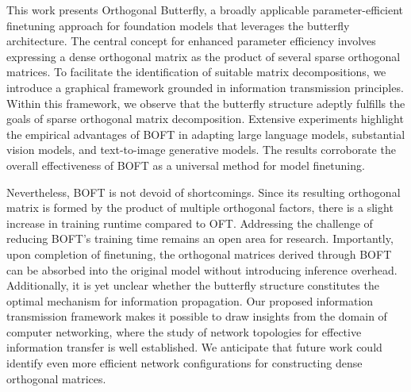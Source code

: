 This work presents Orthogonal Butterfly, a broadly applicable parameter-efficient finetuning approach for foundation models that leverages the butterfly architecture. The central concept for enhanced parameter efficiency involves expressing a dense orthogonal matrix as the product of several sparse orthogonal matrices. To facilitate the identification of suitable matrix decompositions, we introduce a graphical framework grounded in information transmission principles. Within this framework, we observe that the butterfly structure adeptly fulfills the goals of sparse orthogonal matrix decomposition. Extensive experiments highlight the empirical advantages of BOFT in adapting large language models, substantial vision models, and text-to-image generative models. The results corroborate the overall effectiveness of BOFT as a universal method for model finetuning.

Nevertheless, BOFT is not devoid of shortcomings. Since its resulting orthogonal matrix is formed by the product of multiple orthogonal factors, there is a slight increase in training runtime compared to OFT. Addressing the challenge of reducing BOFT’s training time remains an open area for research. Importantly, upon completion of finetuning, the orthogonal matrices derived through BOFT can be absorbed into the original model without introducing inference overhead. Additionally, it is yet unclear whether the butterfly structure constitutes the optimal mechanism for information propagation. Our proposed information transmission framework makes it possible to draw insights from the domain of computer networking, where the study of network topologies for effective information transfer is well established. We anticipate that future work could identify even more efficient network configurations for constructing dense orthogonal matrices.